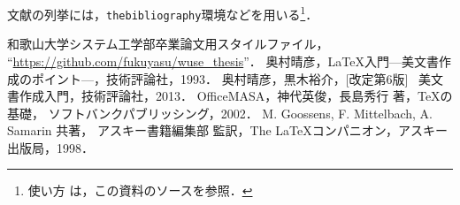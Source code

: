 \documentclass[11pt]{jreport}
\begin{document}
文献の列挙には，{\tt thebibliography}環境などを用いる\footnote{使い方
は，この資料のソースを参照．}．




\begin{thebibliography}{99}
    和歌山大学システム工学部卒業論文用スタイルファイル，
    ``\url{https://github.com/fukuyasu/wuse_thesis}''．
    奥村晴彦，\LaTeX 入門---美文書作成のポイント---，技術評論社，1993．
    奥村晴彦，黒木裕介，[改定第6版] \LaTeXe~美文書作成入門，技術評論社，2013．
    OfficeMASA，神代英俊，長島秀行 著，\TeX の基礎，
    ソフトバンクパブリッシング，2002．
    M. Goossens, F. Mittelbach, A. Samarin 共著，
    アスキー書籍編集部 監訳，The \LaTeX コンパニオン，アスキー出版局，1998．
\end{thebibliography}


% 
% 
% 

\end{document}
